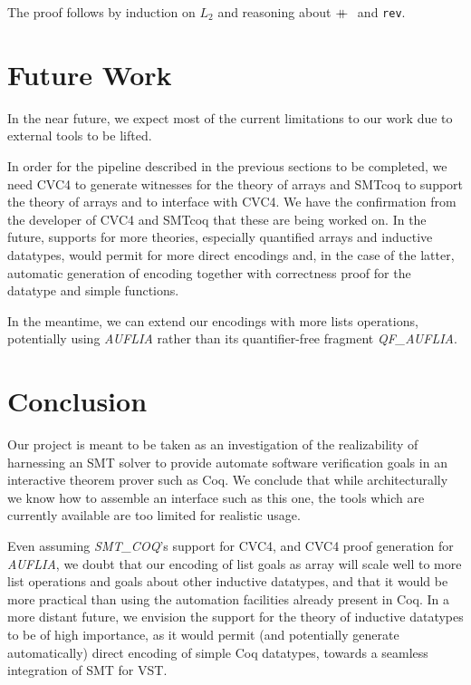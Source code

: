 \documentclass[onecolumn, preprint]{sigplanconf}
\newcommand\doubleplus{+\kern-1.3ex+\kern0.8ex}
\begin{document}

The proof follows by induction on $L_2$ and reasoning about $\doubleplus$ and \texttt{rev}.


\section{Future Work}
\label{sec:future}
In the near future, we expect most of the current limitations to our work due to external tools to be lifted.

In order for the pipeline described in the previous sections to be completed, we need CVC4 to generate witnesses for the theory of arrays and SMTcoq to support the theory of arrays and to interface with CVC4. We have the confirmation from the developer of CVC4 and SMTcoq that these are being worked on. In the future, supports for more theories, especially quantified arrays and inductive datatypes, would permit for more direct encodings and, in the case of the latter, automatic generation of encoding together with correctness proof for the datatype and simple functions.


In the meantime, we can extend our encodings with more lists operations, potentially using \emph{AUFLIA} rather than its quantifier-free fragment \emph{QF\_AUFLIA}.

\section{Conclusion}
\label{sec:conclusion}
Our project is meant to be taken as an investigation of the realizability of harnessing an SMT solver to provide automate software verification goals in an interactive theorem prover such as Coq. We conclude that while architecturally we know how to assemble an interface such as this one, the tools which are currently available are too limited for realistic usage.




Even assuming \emph{SMT\_COQ}'s support for CVC4, and CVC4 proof generation for \emph{AUFLIA}, we doubt that our encoding of list goals as array will scale well to more list operations and goals about other inductive datatypes, and that it would be more practical than using the automation facilities already present in Coq. In a more distant future, we envision the support for the theory of inductive datatypes to be of high importance, as it would permit (and potentially generate automatically)  direct encoding of simple Coq datatypes, towards a seamless integration of SMT for VST.



\end{document}
